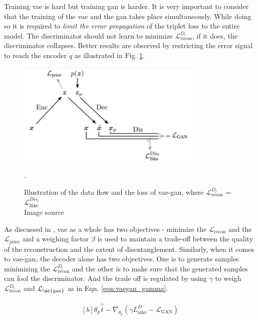 Training \ac{vae} is hard but training \ac{gan} is harder. It is very important to consider that the training of the \ac{vae} and the \ac{gan} takes place simultaneously. While doing so it is required to \textit{limit the error propagation} of the triplet loss to the entire model. The discriminator should not learn to minimize $\mathcal{L}_{\text {recon}}^{D_{l}}$, if it does, the discriminator collapses. Better results are observed by restricting the error signal to reach the encoder $q$ as illustrated in Fig. \ref{fig:vaegan_loss_graph}. 

\begin{figure}[h]
    \centering
    \includegraphics[width=0.8\textwidth]{figures/arch/vae_gan_loss_graph.png}
    \caption{Illustration of the data flow and the loss of \ac{vae}-\ac{gan}, where $\mathcal{L}_{\text {recon}}^{D_{l}}$ = $\mathcal{L}_{\text {llike}}^{Dis_{l}}$ \\
    Image source \cite{autoencoding_beyond_pixels}}. 
    \label{fig:vaegan_loss_graph}
\end{figure}

As discussed in , \ac{vae} as a whole has two objectives - minimize the $\mathcal{L}_{\text {recon}}$ and the $\mathcal{L}_{\text {prior}}$ and a weighing factor $\beta$ is used to maintain a trade-off between the quality of the reconstruction and the extent of disentanglement. Similarly, when it comes to \ac{vae}-\ac{gan}, the decoder alone has two objectives. One is to generate samples minimizing the $\mathcal{L}_{\text {recon}}^{D_{l}}$ and the other is to make sure that the generated samples can fool the discriminator. And the trade off is regulated by using $\gamma$ to weigh $\mathcal{L}_{\text {recon}}^{D_{l}}$ and $\mathcal{L}_{\text {\ac{gan}}}$ as in Eqn. \ref{eqn:vaegan_gamma}.
 
\begin{equation} \label{eqn:vaegan_gamma}
    \begin{gathered}[b]
        \theta_{p} \stackrel{+}{t}-\nabla_{\theta_{p}}\left(\gamma L_{\mathrm{uike}}^{D}-\mathcal{L}_{\mathrm{GAN}}\right)
    \end{gathered}
\end{equation}

